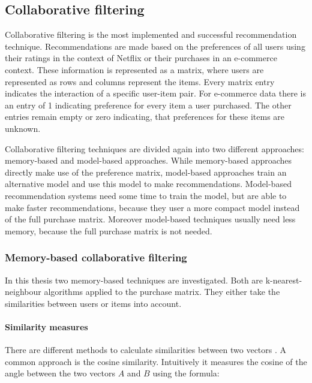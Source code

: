 \documentclass[10pt]{reportMaster}
\begin{document}
\subsection{Collaborative filtering}
\label{sec:collaborativeFiltering}
\label{rs_cf}

Collaborative filtering is the most implemented and successful recommendation technique.
Recommendations are made based on the preferences of all users using their ratings in the context of Netflix or their purchases in an e-commerce context.
These information is represented as a matrix, where users are represented as rows and columns represent the items.
Every matrix entry indicates the interaction of a specific user-item pair.
For e-commerce data there is an entry of 1 indicating preference for every item a user purchased.
The other entries remain empty or zero indicating, that preferences for these items are unknown.

Collaborative filtering techniques are divided again into two different approaches: memory-based and model-based approaches.
While memory-based approaches directly make use of the preference matrix, model-based approaches train an alternative model and use this model to make recommendations.
Model-based recommendation systems need some time to train the model, but are able to make faster recommendations, because they user a more compact model instead of the full purchase matrix.
Moreover model-based techniques usually need less memory, because the full purchase matrix is not needed.

\subsubsection{Memory-based collaborative filtering}
\label{sec:memBasedCF}

In this thesis two memory-based techniques are investigated.
Both are k-nearest-neighbour algorithms applied to the purchase matrix.
They either take the similarities between users or items into account.

\paragraph{Similarity measures}
\label{par:simMeasures}
There are different methods to calculate similarities between two vectors \cite{dataMining}.
A common approach is the cosine similarity.
Intuitively it measures the cosine of the angle between the two vectors $A$ and $B$ using the formula:
\end{document}
